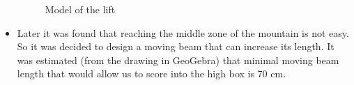 \begin{itemize}
\begin{figure}[H]
\begin{minipage}[h]{0.6\linewidth}
		\caption{Model of the lift}
	\end{minipage}
\end{figure}

\item Later it was found that reaching the middle zone of the mountain is not easy. So it was decided to design a moving beam that can increase its length. It was estimated (from the drawing in GeoGebra) that minimal moving beam length that would allow us to score into the high box is 70 cm.


\end{itemize}
